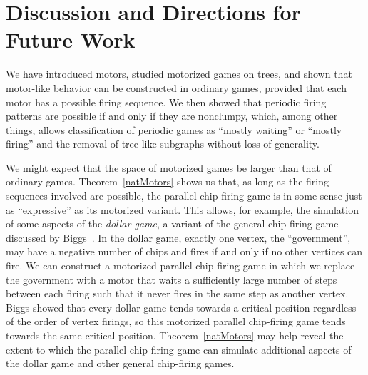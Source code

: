 \section{Discussion and Directions for Future Work} \label{discussion}

We have introduced motors, studied motorized games on trees, and shown that
motor-like behavior can be constructed in ordinary games, provided that each
motor has a possible firing sequence. We then showed that periodic firing
patterns are possible if and only if they are nonclumpy, which, among other
things, allows classification of periodic games as ``mostly waiting'' or
``mostly firing'' and the removal of tree-like subgraphs without loss of
generality.

We might expect that the space of motorized games be larger than that of
ordinary games. Theorem~\ref{natMotors} shows us that, as long as the firing
sequences involved are possible, the parallel chip-firing game is in some sense
just as ``expressive'' as its motorized variant. This allows, for example, the
simulation of some aspects of the \emph{dollar game}, a variant of the general
chip-firing game discussed by Biggs~\cite{biggs}. In the dollar game, exactly
one vertex, the ``government'', may have a negative number of chips and fires
if and only if no other vertices can fire. We can construct a motorized
parallel chip-firing game in which we replace the government with a motor that
waits a sufficiently large number of steps between each firing such that it
never fires in the same step as another vertex. Biggs showed that every dollar
game tends towards a critical position regardless of the order of vertex
firings, so this motorized parallel chip-firing game tends towards the same
critical position. Theorem~\ref{natMotors} may help reveal the extent to which
the parallel chip-firing game can simulate additional aspects of the dollar
game and other general chip-firing games.

